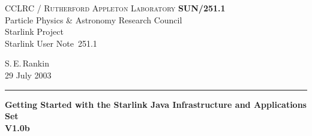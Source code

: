 \documentclass[twoside,11pt]{article}
\newcommand{\stardoccategory}  {Starlink User Note}
\newcommand{\stardocinitials}  {SUN}
\newcommand{\stardocnumber}    {251.1}
\newcommand{\stardocauthors}   {S.\,E.\,Rankin}
\newcommand{\stardocdate}      {29 July 2003}
\newcommand{\stardoctitle}     {Getting Started with the Starlink Java Infrastructure and Applications Set}
\newcommand{\stardocversion}   {V1.0b}
\newcommand{\stardocmanual}    {}
\newcommand{\stardocname}{\stardocinitials /\stardocnumber}
\newenvironment{latexonly}{}{}
\renewcommand{\_}{\texttt{\symbol{95}}}
\begin{document}
\thispagestyle{empty}

\begin{latexonly}
   CCLRC / \textsc{Rutherford Appleton Laboratory} \hfill \textbf{\stardocname}\\
   {\large Particle Physics \& Astronomy Research Council}\\
   {\large Starlink Project\\}
   {\large \stardoccategory\ \stardocnumber}
   \begin{flushright}
   \stardocauthors\\
   \stardocdate
   \end{flushright}
   \vspace{-4mm}
   \rule{\textwidth}{0.5mm}
   \vspace{5mm}
   \begin{center}
   {\Huge\textbf{\stardoctitle \\ [2.5ex]}}
   {\LARGE\textbf{\stardocversion \\ [4ex]}}
   {\Huge\textbf{\stardocmanual}}
   \end{center}
   \vspace{5mm}



\end{latexonly}
\end{document}

